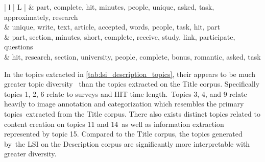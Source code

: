 \documentclass[letterpaper,12pt]{article}
\begin{document}
\begin{table}
\begin{center}
\begin{tabular}{| l | L |}
			 &                 part, complete, hit, minutes, people, unique, asked, task, approximately, research \\
			 &                             unique, write, text, article, accepted, words, people, task, hit, part \\
			 &              part, section, minutes, short, complete, receive, study, link, participate, questions \\
			 &                 hit, research, section, university, people, complete, bonus, romantic, asked, task \\
			\hline
			\end{tabular}
	\end{center}
\end{table}

In the topics extracted in \ref{tab:lsi_description_topics}, their appears to be much greater topic diversity \
than the topics extracted on the Title corpus. Specifically topics 1, 2, 6 relate to surveys and HIT time length.\
Topics 3, 4, and 9 relate heavily to image annotation and categorization which resembles the primary topics\
extracted from the Title corpus. There also exists distinct topics related to content creation on topics 11 and 14\
as well as information extraction represented by topic 15. Compared to the Title corpus, the topics generated by\
the LSI on the Description corpus are significantly more interpretable with greater diversity.
\newpage
\end{document}
